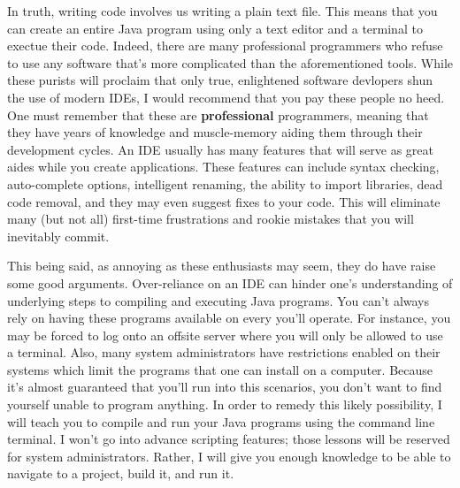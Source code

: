 In truth, writing code involves us writing a plain text file.
This means that you can create an entire Java program using only a text editor and a terminal to exectue their code.
Indeed, there are many professional programmers who refuse to use any software that's more complicated than the aforementioned tools.
While these purists will proclaim that only true, enlightened software devlopers shun the use of modern \gls{IDE}s, I would recommend that you pay these people no heed.
One must remember that these are \textbf{professional} programmers, meaning that they have years of knowledge and muscle-memory aiding them through their development cycles.
An \gls{IDE} usually has many features that will serve as great aides while you create applications.
These features can include syntax checking, auto-complete options, intelligent renaming, the ability to import libraries, dead code removal, and they may even suggest fixes to your code.
This will eliminate many (but not all) first-time frustrations and rookie mistakes that you will inevitably commit.

This being said, as annoying as these enthusiasts may seem, they do have raise some good arguments.
Over-reliance on an IDE can hinder one's understanding of underlying steps to compiling and executing Java programs.
You can't always rely on having these programs available on every you'll operate.
For instance, you may be forced to log onto an offsite server where you will only be allowed to use a terminal.
Also, many system administrators have restrictions enabled on their systems which limit the programs that one can install on a computer.
Because it's almost guaranteed that you'll run into this scenarios, you don't want to find yourself unable to program anything.
In order to remedy this likely possibility, I will teach you to compile and run your Java programs using the command line terminal.
I won't go into advance scripting features; those lessons will be reserved for system administrators.
Rather, I will give you enough knowledge to be able to navigate to a project, build it, and run it.







